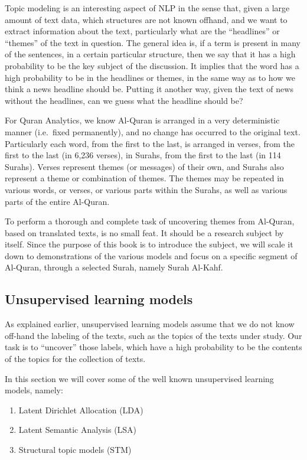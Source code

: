 \documentclass[
]{article}
\providecommand{\tightlist}{%
  \setlength{\itemsep}{0pt}\setlength{\parskip}{0pt}}
\begin{document}
Topic modeling is an interesting aspect of NLP in the sense that, given a large amount of text data, which structures are not known offhand, and we want to extract information about the text, particularly what are the ``headlines'' or ``themes'' of the text in question. The general idea is, if a term is present in many of the sentences, in a certain particular structure, then we say that it has a high probability to be the key subject of the discussion. It implies that the word has a high probability to be in the headlines or themes, in the same way as to how we think a news headline should be. Putting it another way, given the text of news without the headlines, can we guess what the headline should be?

For Quran Analytics, we know Al-Quran is arranged in a very deterministic manner (i.e.~fixed permanently), and no change has occurred to the original text. Particularly each word, from the first to the last, is arranged in verses, from the first to the last (in 6,236 verses), in Surahs, from the first to the last (in 114 Surahs). Verses represent themes (or messages) of their own, and Surahs also represent a theme or combination of themes. The themes may be repeated in various words, or verses, or various parts within the Surahs, as well as various parts of the entire Al-Quran.

To perform a thorough and complete task of uncovering themes from Al-Quran, based on translated texts, is no small feat. It should be a research subject by itself. Since the purpose of this book is to introduce the subject, we will scale it down to demonstrations of the various models and focus on a specific segment of Al-Quran, through a selected Surah, namely Surah Al-Kahf.

\hypertarget{unsupervised-learning-models}{%
\subsection{Unsupervised learning models}\label{unsupervised-learning-models}}

As explained earlier, unsupervised learning models assume that we do not know off-hand the labeling of the texts, such as the topics of the texts under study. Our task is to ``uncover'' those labels, which have a high probability to be the contents of the topics for the collection of texts.

In this section we will cover some of the well known unsupervised learning models, namely:

\begin{enumerate}
\def\labelenumi{\arabic{enumi}.}
\tightlist
\item
  Latent Dirichlet Allocation (LDA)
\item
  Latent Semantic Analysis (LSA)
\item
  Structural topic models (STM)
\end{enumerate}
\end{document}
